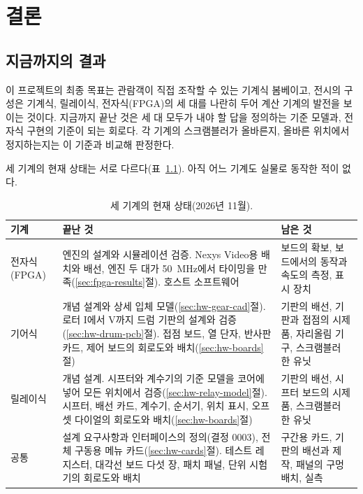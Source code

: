\chapter{결론}\label{ch:conclusion}

\section{지금까지의 결과}

이 프로젝트의 최종 목표는 관람객이 직접 조작할 수 있는 기계식 봄베이고, 전시의 구성은 기계식, 릴레이식,
전자식(FPGA)의 세 대를 나란히 두어 계산 기계의 발전을 보이는 것이다. 지금까지 끝난 것은 세 대 모두가
내야 할 답을 정의하는 기준 모델과, 전자식 구현의 기준이 되는 회로다. 각 기계의 스크램블러가 올바른지,
올바른 위치에서 정지하는지는 이 기준과 비교해 판정한다.

세 기계의 현재 상태는 서로 다르다(표~\ref{tab:status}). 아직 어느 기계도 실물로 동작한 적이 없다.

\begin{table}[ht]
\centering
\caption{세 기계의 현재 상태(2026년 11월).}
\label{tab:status}
\small
\begin{tabularx}{\linewidth}{>{\raggedright\arraybackslash}p{22mm}>{\raggedright\arraybackslash}X>{\raggedright\arraybackslash}X}
\toprule
기계 & 끝난 것 & 남은 것 \\
\midrule
전자식 (FPGA) & 엔진의 설계와 시뮬레이션 검증. Nexys Video용 배치와 배선, 엔진 두 대가 50~MHz에서 타이밍을
  만족(\ref{sec:fpga-results}절). 호스트 소프트웨어 & 보드의 확보, 보드에서의 동작과 속도의 측정, 표시 장치 \\
기어식 & 개념 설계와 상세 입체 모델(\ref{sec:hw-gear-cad}절). 로터 I에서 V까지 드럼 기판의 설계와
  검증(\ref{sec:hw-drum-pcb}절). 접점 보드, 열 단자, 반사판 카드, 제어 보드의 회로도와 배치(\ref{sec:hw-boards}절)
  & 기판의 배선, 기판과 접점의 시제품, 자리올림 기구, 스크램블러 한 유닛 \\
릴레이식 & 개념 설계. 시프터와 계수기의 기준 모델을 코어에 넣어 모든 위치에서 검증(\ref{sec:hw-relay-model}절).
  시프터, 배선 카드, 계수기, 순서기, 위치 표시, 오프셋 다이얼의 회로도와 배치(\ref{sec:hw-boards}절)
  & 기판의 배선, 시프터 보드의 시제품, 스크램블러 한 유닛 \\
공통 & 설계 요구사항과 인터페이스의 정의(결정 0003), 전체 구동용 메뉴 카드(\ref{sec:hw-cards}절). 테스트 레지스터,
  대각선 보드 다섯 장, 패치 패널, 단위 시험기의 회로도와 배치 & 구간용 카드, 기판의 배선과 제작, 패널의 구멍 배치,
  실측 \\
\bottomrule
\end{tabularx}
\end{table}

